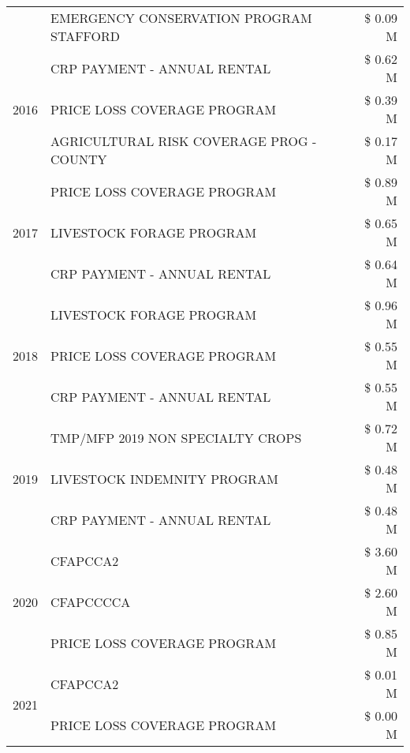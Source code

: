 \begin{tabular}{llr}
 & EMERGENCY CONSERVATION PROGRAM STAFFORD & \$ 0.09 M \\
\cline{1-3}
\multirow[t]{3}{*}{2016} & CRP PAYMENT - ANNUAL RENTAL & \$ 0.62 M \\
 & PRICE LOSS COVERAGE PROGRAM & \$ 0.39 M \\
 & AGRICULTURAL RISK COVERAGE PROG - COUNTY & \$ 0.17 M \\
\cline{1-3}
\multirow[t]{3}{*}{2017} & PRICE LOSS COVERAGE PROGRAM & \$ 0.89 M \\
 & LIVESTOCK FORAGE PROGRAM & \$ 0.65 M \\
 & CRP PAYMENT - ANNUAL RENTAL & \$ 0.64 M \\
\cline{1-3}
\multirow[t]{3}{*}{2018} & LIVESTOCK FORAGE PROGRAM & \$ 0.96 M \\
 & PRICE LOSS COVERAGE PROGRAM & \$ 0.55 M \\
 & CRP PAYMENT - ANNUAL RENTAL & \$ 0.55 M \\
\cline{1-3}
\multirow[t]{3}{*}{2019} & TMP/MFP 2019 NON SPECIALTY CROPS & \$ 0.72 M \\
 & LIVESTOCK INDEMNITY PROGRAM & \$ 0.48 M \\
 & CRP PAYMENT - ANNUAL RENTAL & \$ 0.48 M \\
\cline{1-3}
\multirow[t]{3}{*}{2020} & CFAPCCA2 & \$ 3.60 M \\
 & CFAPCCCCA & \$ 2.60 M \\
 & PRICE LOSS COVERAGE PROGRAM & \$ 0.85 M \\
\cline{1-3}
\multirow[t]{2}{*}{2021} & CFAPCCA2 & \$ 0.01 M \\
 & PRICE LOSS COVERAGE PROGRAM & \$ 0.00 M \\
\cline{1-3}
\bottomrule
\end{tabular}
